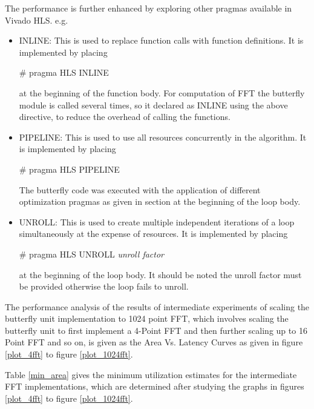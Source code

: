 The performance is further enhanced by exploring other pragmas available in Vivado HLS. e.g.
\begin{itemize}
\item
INLINE: This is used to replace function calls with function definitions. It is implemented by placing

\hspace{3cm}\# pragma HLS INLINE

at the beginning of the function body.
For computation of FFT the butterfly module is called several times, so it declared as INLINE using the above directive, to reduce the overhead of calling the functions.
\item
PIPELINE: This is used to use all resources concurrently in the algorithm. It is implemented by placing

\hspace{3cm}\# pragma HLS PIPELINE

The butterfly code was executed with the application of different optimization pragmas as given in section 
at the beginning of the loop body.

\item
UNROLL: This is used to create multiple independent iterations of a loop simultaneously at the expense of resources. It is implemented by placing

\hspace{3cm}\# pragma HLS UNROLL \textit{unroll factor}

at the beginning of the loop body.
It should be noted the unroll factor must be provided otherwise the loop fails to unroll.
\end{itemize}

The performance analysis of the results of intermediate experiments of scaling the butterfly unit implementation to 1024 point FFT, which involves scaling the butterfly unit to first implement a 4-Point FFT and then further scaling up to 16 Point FFT and so on, is given as the Area Vs. Latency Curves as given in figure \ref {plot_4fft} to figure \ref{plot_1024fft}.









Table \ref{min_area} gives the minimum utilization estimates for the intermediate FFT implementations, which are determined after studying the graphs in figures \ref {plot_4fft} to figure \ref{plot_1024fft}.

